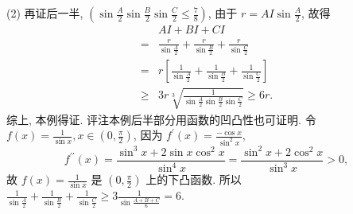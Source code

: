 (2) 再证后一半, $\left(\sin \frac{A}{2} \sin \frac{B}{2} \sin \frac{C}{2} \leqslant \frac{7}{8}\right)$, 由于 $r=A I \sin \frac{A}{2}$, 故得
$$
\begin{aligned}
& A I+B I+C I \\
= & \frac{r}{\sin \frac{A}{2}}+\frac{r}{\sin \frac{B}{2}}+\frac{r}{\sin \frac{C}{2}} \\
= & r\left[\frac{1}{\sin \frac{A}{2}}+\frac{1}{\sin \frac{B}{2}}+\frac{1}{\sin \frac{C}{2}}\right] \\
\geqslant & 3 r \sqrt[3]{\frac{1}{\sin \frac{A}{2} \sin \frac{B}{2} \sin \frac{C}{2}}} \geqslant 6 r .
\end{aligned}
$$
综上, 本例得证.
评注本例后半部分用函数的凹凸性也可证明.
令 $f(x)=\frac{1}{\sin x}, x \in\left(0, \frac{\pi}{2}\right)$, 因为 $f^{\prime}(x)=\frac{-\cos x}{\sin ^2 x}$,
$$
f^{\prime \prime}(x)=\frac{\sin ^3 x+2 \sin x \cos ^2 x}{\sin ^4 x}=\frac{\sin ^2 x+2 \cos ^2 x}{\sin ^3 x}>0,
$$
故 $f(x)=\frac{1}{\sin x}$ 是 $\left(0, \frac{\pi}{2}\right)$ 上的下凸函数.
所以 $\frac{1}{\sin \frac{A}{2}}+\frac{1}{\sin \frac{B}{2}}+\frac{1}{\sin \frac{C}{2}} \geqslant 3 \frac{1}{\sin \frac{A+B+C}{6}}=6$.



